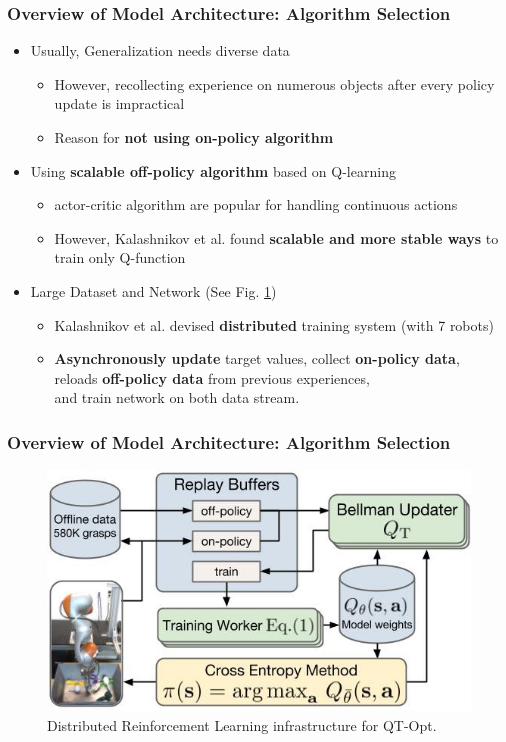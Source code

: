 \documentclass{beamer}
\newcommand{\thirdSec}{Overview of Model Architecture}
\begin{document}
    \begin{frame}
      \frametitle{\thirdSec: Algorithm Selection}
      \begin{itemize}
        \item Usually, Generalization needs diverse data
        \begin{itemize}
          \item However, recollecting experience on numerous objects after every policy update is impractical
          \item Reason for \textbf{not using on-policy algorithm}
        \end{itemize}
        \item Using \textbf{scalable off-policy algorithm} based on Q-learning
        \begin{itemize}
          \item actor-critic algorithm are popular for handling continuous actions
          \item However, Kalashnikov et al. found \textbf{scalable and more stable ways} to train only Q-function
        \end{itemize}
        \item Large Dataset and Network (See Fig. \ref{fig:ModelStructure})
        \begin{itemize}
          \item Kalashnikov et al. devised \textbf{distributed} training system (with 7 robots)
          \item \textbf{Asynchronously update} target values, collect \textbf{on-policy data}, \\
                reloads \textbf{off-policy data} from previous experiences, \\ 
                and train network on both data stream.
        \end{itemize}
      \end{itemize}
    \end{frame}

    \begin{frame}
      \frametitle{\thirdSec : Algorithm Selection}
      \begin{figure}
        \centering
        \includegraphics[]{Images/ModelStructure.jpg}
        \caption{Distributed Reinforcement Learning infrastructure for QT-Opt.}
        \label{fig:ModelStructure}
      \end{figure}
    \end{frame}
\end{document}

